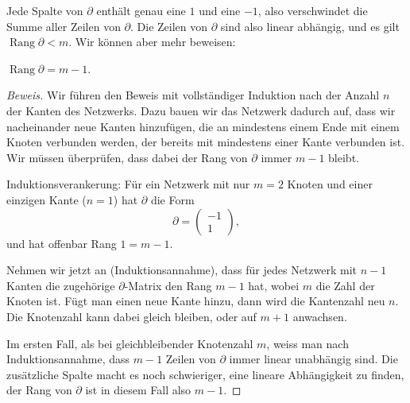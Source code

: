 Jede Spalte von $\partial$ enthält genau eine $1$ und eine $-1$, also
verschwindet die Summe aller Zeilen von $\partial$.
Die Zeilen von $\partial$ sind also linear abhängig, und es
gilt $\operatorname{Rang}\partial < m$. Wir können aber mehr
beweisen:

\begin{satz} $\operatorname{Rang}\partial = m-1$.
\label{partialrank}
\end{satz}

\begin{proof}[Beweis]
Wir führen den Beweis mit vollständiger Induktion nach der Anzahl $n$
der Kanten des Netzwerks.
Dazu bauen wir das Netzwerk dadurch auf, dass wir nacheinander neue 
Kanten hinzufügen, die an mindestens einem Ende mit einem Knoten
verbunden werden, der bereits mit mindestens einer Kante verbunden
ist. Wir müssen überprüfen, dass dabei der Rang von $\partial$
immer $m-1$ bleibt.

Induktionsverankerung: Für ein Netzwerk mit nur $m=2$ Knoten und
einer einzigen Kante ($n=1$) hat
$\partial$ die Form
\[
\partial=\begin{pmatrix}-1\\1\end{pmatrix},
\]
und hat offenbar Rang $1=m-1$. 

Nehmen wir jetzt an (Induktionsannahme), dass für jedes Netzwerk mit $n-1$
Kanten die zugehörige $\partial$-Matrix den Rang $m-1$ hat,
wobei $m$ die Zahl der Knoten ist.
Fügt man einen neue Kante hinzu, dann wird die Kantenzahl neu $n$.
Die Knotenzahl kann dabei gleich bleiben, oder auf $m+1$ anwachsen.

Im ersten Fall, als bei gleichbleibender Knotenzahl $m$,
weiss man nach Induktionsannahme, dass $m-1$ Zeilen
von $\partial$ immer linear unabhängig sind.
Die zusätzliche Spalte macht es noch schwieriger, eine lineare
Abhängigkeit zu finden, der Rang von $\partial$ ist in diesem
Fall also $m-1$.


\end{proof}
